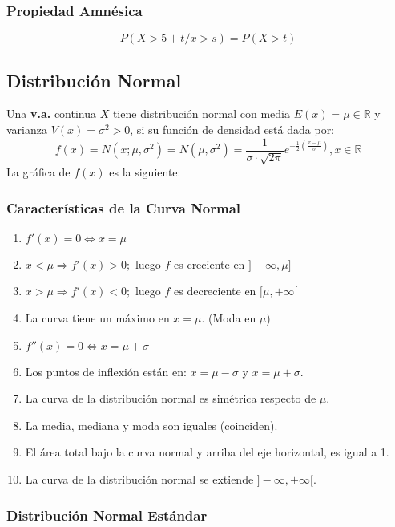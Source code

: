 \subsubsection{Propiedad Amnésica}
$$P(X>5+t / x> s)=P(X>t)$$

\subsection{Distribución Normal}
Una \textbf{v.a.} continua $X$ tiene distribución normal con media $E(x)=\mu \in \mathbb{R}$ y varianza $V(x)=\sigma^2 >0$, si su función de densidad está dada por:
$$
f(x) = N(x;\mu,\sigma^2)=N(\mu,\sigma^2)=\dfrac{1}{\sigma \cdot \sqrt{2\pi}}e^{-\frac{1}{2}(\frac{x-\mu}{\sigma})}, x\in \mathbb{R}
$$
La gráfica de $f(x)$ es la siguiente:
\subsubsection{Características de la Curva Normal}
\begin{enumerate}
\item $f'(x)=0\Leftrightarrow x=\mu$
\item $x<\mu \Rightarrow f'(x)>0;$ luego $f$ es creciente en $]-\infty,\mu]$
\item $x>\mu \Rightarrow f'(x)<0;$ luego $f$ es decreciente en $[\mu,+\infty[$
\item La curva tiene un máximo en $x=\mu$. (Moda en $\mu$)
\item $f''(x)=0 \Leftrightarrow x = \mu + \sigma$
\item Los puntos de inflexión están en: $x=\mu-\sigma$ y $x=\mu+\sigma$.
\item La curva de la distribución normal es simétrica respecto de $\mu$.
\item La media, mediana y moda son iguales (coinciden).
\item El área total bajo la curva normal y arriba del eje horizontal, es igual a 1.
\item La curva de la distribución normal se extiende $]-\infty,+\infty[$.
\end{enumerate}
\subsubsection{Distribución Normal Estándar}